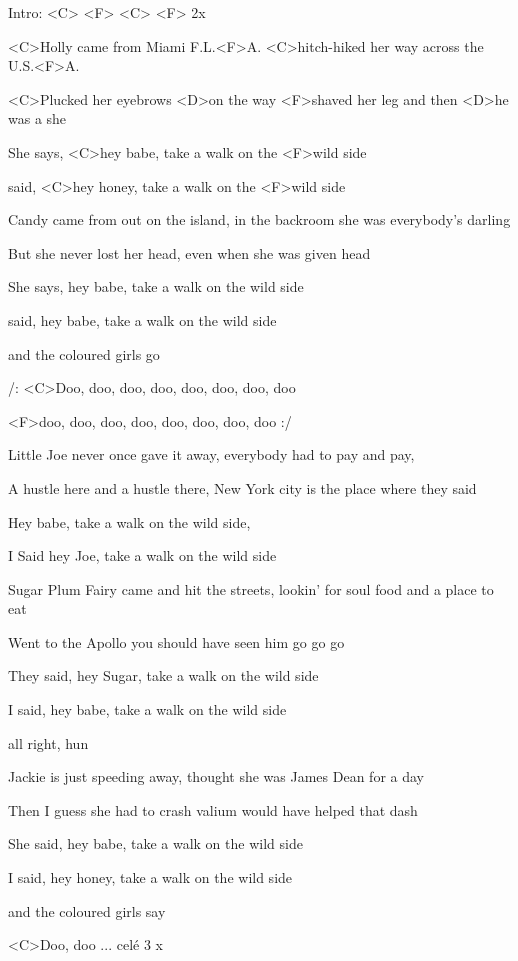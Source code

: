 

Intro: <C> <F> <C> <F> 2x 

\zs
<C>Holly came from Miami F.L.<F>A. <C>hitch-hiked her way across the U.S.<F>A. 

<C>Plucked her eyebrows <D>on the way <F>shaved her leg and then <D>he was a she 

She says, <C>hey babe, take a walk on the <F>wild side 

said, <C>hey honey, take a walk on the <F>wild side 
\ks

\zs
Candy came from out on the island, in the backroom she was everybody's darling 

But she never lost her head, even when she was given head 

She says, hey babe, take a walk on the wild side 

said, hey babe, take a walk on the wild side 

and the coloured girls go 
\ks

\zr
/: <C>Doo, doo, doo, doo, doo, doo, doo, doo
 
<F>doo, doo, doo, doo, doo, doo, doo, doo :/ 
\kr

\zs
Little Joe never once gave it away, everybody had to pay and pay, 

A hustle here and a hustle there, New York city is the place where they said 

Hey babe, take a walk on the wild side, 

I Said hey Joe, take a walk on the wild side 
\ks

\zs
Sugar Plum Fairy came and hit the streets, lookin' for soul food and a place to eat 

Went to the Apollo you should have seen him go go go
 
They said, hey Sugar, take a walk on the wild side 

I said, hey babe, take a walk on the wild side 

all right, hun 
\ks

\zs
Jackie is just speeding away, thought she was James Dean for a day 

Then I guess she had to crash valium would have helped that dash 

She said, hey babe, take a walk on the wild side 

I said, hey honey, take a walk on the wild side 

and the coloured girls say 
\ks

\zr
<C>Doo, doo ... celé 3 x 
\kr
\kp
